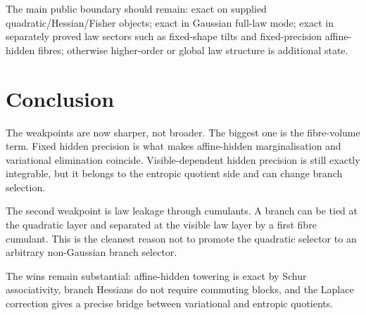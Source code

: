 \documentclass[11pt,a4paper]{article}
\numberwithin{equation}{section}
\theoremstyle{thmcompact}
\theoremstyle{remark}
\begin{document}
The main public boundary should remain: exact on supplied quadratic/Hessian/Fisher objects; exact in Gaussian full-law mode; exact in separately proved law sectors such as fixed-shape tilts and fixed-precision affine-hidden fibres; otherwise higher-order or global law structure is additional state.

\section{Conclusion}

The weakpoints are now sharper, not broader. The biggest one is the fibre-volume term. Fixed hidden precision is what makes affine-hidden marginalisation and variational elimination coincide. Visible-dependent hidden precision is still exactly integrable, but it belongs to the entropic quotient side and can change branch selection.

The second weakpoint is law leakage through cumulants. A branch can be tied at the quadratic layer and separated at the visible law layer by a first fibre cumulant. This is the cleanest reason not to promote the quadratic selector to an arbitrary non-Gaussian branch selector.

The wins remain substantial: affine-hidden towering is exact by Schur associativity, branch Hessians do not require commuting blocks, and the Laplace correction gives a precise bridge between variational and entropic quotients.
\end{document}

